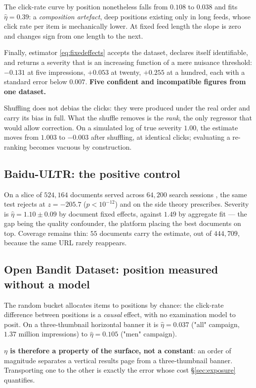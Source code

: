 \documentclass[11pt,a4paper]{article}
\begin{document}
The click-rate curve by position nonetheless falls from $0.108$ to $0.038$ and fits
$\hat\eta = 0.39$: a \emph{composition artefact}, deep positions existing only in long feeds,
whose click rate per item is mechanically lower. At fixed feed length the slope is zero and
changes sign from one length to the next.

Finally, estimator \eqref{eq:fixedeffects} accepts the dataset, declares itself identifiable,
and returns a severity that is an increasing function of a mere nuisance threshold: $-0.131$ at
five impressions, $+0.053$ at twenty, $+0.255$ at a hundred, each with a standard error below
$0.007$. \textbf{Five confident and incompatible figures from one dataset.}

Shuffling does not debias the clicks: they were produced under the real order and carry its bias
in full. What the shuffle removes is the \emph{rank}, the only regressor that would allow
correction. On a simulated log of true severity $1.00$, the estimate moves from $1.003$ to
$-0.003$ after shuffling, at identical clicks; evaluating a re-ranking becomes vacuous by
construction.

\subsection{Baidu-ULTR: the positive control}

On a slice of $524{,}164$ documents served across $64{,}200$ search sessions \citep{zou2022},
the same test rejects at $z = -205.7$ ($p < 10^{-12}$) and on the side theory prescribes.
Severity is $\hat\eta = 1.10 \pm 0.09$ by document fixed effects, against $1.49$ by aggregate
fit --- the gap being the quality confounder, the platform placing the best documents on top.
Coverage remains thin: $55$ documents carry the estimate, out of $444{,}709$, because the same
URL rarely reappears.

\subsection{Open Bandit Dataset: position measured without a model}

The random bucket allocates items to positions by chance: the click-rate difference between
positions is a \emph{causal} effect, with no examination model to posit. On a three-thumbnail
horizontal banner it is $\hat\eta = 0.037$ ("all" campaign, $1.37$ million impressions) to
$\hat\eta = 0.105$ ("men" campaign).

\textbf{$\eta$ is therefore a property of the surface, not a constant}: an order of magnitude
separates a vertical results page from a three-thumbnail banner. Transporting one to the other
is exactly the error whose cost \S\ref{sec:exposure} quantifies.
\end{document}
